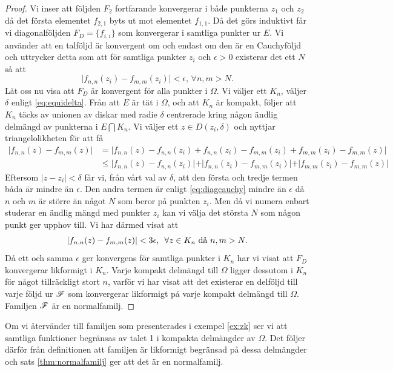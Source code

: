 \begin{proof}
	Vi inser att följden $F_2$ fortfarande konvergerar i både punkterna $z_1$ och $z_2$ då det första elementet $f_{2,1}$ byts ut mot elementet $f_{1,1}$. Då det görs induktivt får vi diagonalföljden $F_{D} = \{ f_{i,i}\}$ som konvergerar i samtliga punkter ur $E$. Vi använder att en talföljd är konvergent om och endast om den är en Cauchyföljd och uttrycker detta som att för samtliga punkter $z_i$ och $\epsilon > 0$ existerar det ett $N$ så att
	\begin{equation}
		\label{eq:diagcauchy}
		\vert f_{n, n}(z_i) - f_{m, m}(z_i) \vert < \epsilon \text{,  $\forall n, m > N$.}
	\end{equation}
	Låt oss nu visa att $F_D$ är konvergent för alla punkter i $\Omega$. Vi väljer ett $K_n$, väljer $\delta$ enligt \eqref{eq:equidelta}. Från att $E$ är tät i $\Omega$, och att $K_n$ är kompakt, följer att $K_n$ täcks av unionen av diskar med radie $\delta$ centrerade kring någon ändlig delmängd av punkterna i $E \bigcap K_n $. Vi väljer ett $z \in D(z_i, \delta)$ och nyttjar triangelolikheten för att få
	\begin{align*}
		\vert f_{n,n}(z) - f_{m,m}(z) \vert & = \vert f_{n,n}(z) - f_{n,n}(z_i) + f_{n,n}(z_i) - f_{m,m}(z_i) + f_{m,m}(z_i) - f_{m,m}(z) \vert                           \\
		                                    & \le \vert f_{n,n}(z) - f_{n,n}(z_i) \vert + \vert f_{n,n}(z_i) - f_{m,m}(z_i) \vert + \vert f_{m,m}(z_i) - f_{m,m}(z) \vert
	\end{align*}
	Eftersom $\vert z - z_i \vert < \delta$ får vi, från vårt val av $\delta$, att den första och tredje termen båda är mindre än $\epsilon$. Den andra termen är enligt \eqref{eq:diagcauchy} mindre än $\epsilon$ då $n$ och $m$ är större än något $N$ som beror på punkten $z_i$. Men då vi numera enbart studerar en ändlig mängd med punkter $z_i$ kan vi välja det största $N$ som någon punkt ger upphov till. Vi har därmed visat att
	\begin{equation*}
		\vert f_{n,n}(z) - f_{m,m}(z) \vert < 3\epsilon, \hskip 5pt \forall z \in K_n \text{ då }n, m > N.
	\end{equation*}
	Då ett och samma $\epsilon$ ger konvergens för samtliga punkter i $K_n$ har vi visat att $F_D$ konvergerar likformigt i $K_n$. Varje kompakt delmängd till $\Omega$ ligger dessutom i $K_n$ för något tillräckligt stort $n$, varför vi har visat att det existerar en delföljd till varje följd ur $\mathscr{F}$ som konvergerar likformigt på varje kompakt delmängd till $\Omega$. Familjen $\mathscr{F}$ är en normalfamilj.
\end{proof}

\begin{example}
    Om vi återvänder till familjen som presenterades i exempel \ref{ex:zk} ser vi att samtliga funktioner begränsas av talet 1 i kompakta delmängder av $\Omega$. Det följer därför från definitionen att familjen är likformigt begränsad på dessa delmängder och sats \ref{thm:normalfamilj} ger att det är en normalfamilj. 
\end{example}
